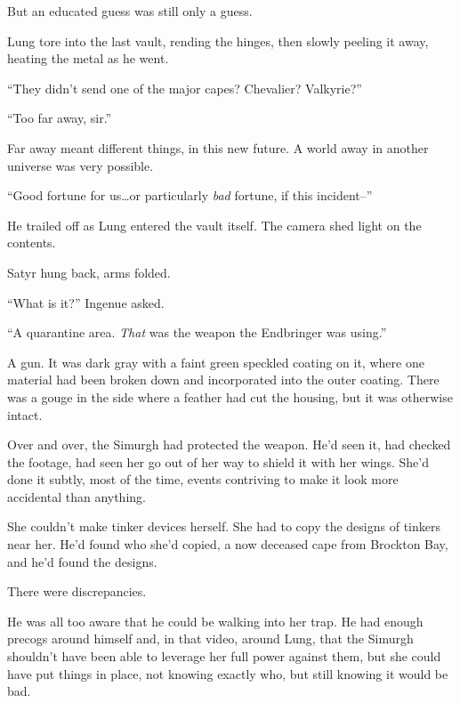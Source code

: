 But an educated guess was still only a guess.



Lung tore into the last vault, rending the hinges, then slowly peeling it away, heating the metal as he went.



``They didn't send one of the major capes?  Chevalier?  Valkyrie?''



``Too far away, sir.''



Far away meant different things, in this new future.  A world away in another universe was very possible.



``Good fortune for us\ldots or particularly \emph{bad} fortune, if this incident--''



He trailed off as Lung entered the vault itself.  The camera shed light on the contents.



Satyr hung back, arms folded.



``What is it?''  Ingenue asked.



``A quarantine area.  \emph{That} was the weapon the Endbringer was using.''



A gun.  It was dark gray with a faint green speckled coating on it, where one material had been broken down and incorporated into the outer coating.  There was a gouge in the side where a feather had cut the housing, but it was otherwise intact.



Over and over, the Simurgh had protected the weapon.  He'd seen it, had checked the footage, had seen her go out of her way to shield it with her wings.  She'd done it subtly, most of the time, events contriving to make it look more accidental than anything.



She couldn't make tinker devices herself.  She had to copy the designs of tinkers near her.  He'd found who she'd copied, a now deceased cape from Brockton Bay, and he'd found the designs.



There were discrepancies.



He was all too aware that he could be walking into her trap.  He had enough precogs around himself and, in that video, around Lung, that the Simurgh shouldn't have been able to leverage her full power against them, but she could have put things in place, not knowing exactly who, but still knowing it would be bad.



